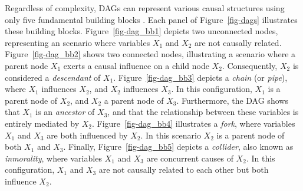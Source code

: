 \documentclass[
  authoryear,
  preprint,
  1p]{elsarticle}
\begin{document}
Regardless of complexity, DAGs can represent various causal structures
using only five fundamental building blocks
\citep{Neal_2020, McElreath_2020}. Each panel of Figure~\ref{fig-dags}
illustrates these building blocks. Figure~\ref{fig-dag_bb1} depicts two
unconnected nodes, representing an scenario where variables \(X_{1}\)
and \(X_{2}\) are not causally related. Figure~\ref{fig-dag_bb2} shows
two connected nodes, illustrating a scenario where a parent node
\(X_{1}\) exerts a causal influence on a child node \(X_{2}\).
Consequently, \(X_{2}\) is considered a \emph{descendant} of \(X_{1}\).
Figure~\ref{fig-dag_bb3} depicts a \emph{chain} (or \emph{pipe}), where
\(X_{1}\) influences \(X_{2}\), and \(X_{2}\) influences \(X_{3}\). In
this configuration, \(X_{1}\) is a parent node of \(X_{2}\), and
\(X_{2}\) a parent node of \(X_{3}\). Furthermore, the DAG shows that
\(X_{1}\) is an \emph{ancestor} of \(X_{3}\), and that the relationship
between these variables is entirely mediated by \(X_{2}\).
Figure~\ref{fig-dag_bb4} illustrates a \emph{fork}, where variables
\(X_{1}\) and \(X_{3}\) are both influenced by \(X_{2}\). In this
scenario \(X_{2}\) is a parent node of both \(X_{1}\) and \(X_{3}\).
Finally, Figure~\ref{fig-dag_bb5} depicts a \emph{collider}, also known
as \emph{inmorality}, where variables \(X_{1}\) and \(X_{3}\) are
concurrent causes of \(X_{2}\). In this configuration, \(X_{1}\) and
\(X_{3}\) are not causally related to each other but both influence
\(X_{2}\).
\end{document}
